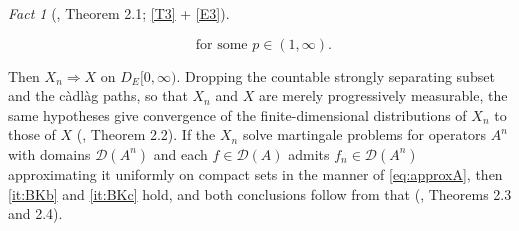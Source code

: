 \documentclass[11pt,a4paper]{article}
\theoremstyle{plain}
\theoremstyle{definition}
\theoremstyle{remark}
\newtheorem{fact}[theorem]{Fact}
\newcommand{\DE}{D_E[0,\infty)}
\newcommand{\dom}{\mathcal{D}}                 %
\DeclareMathOperator*{\wto}{\Rightarrow}
\newcommand{\BK}{\cite{BK93}}
\begin{document}
\begin{fact}[\BK, Theorem 2.1; \eqref{T3} + \eqref{E3}]
\begin{enumerate}[label=(\alph*)]
\begin{equation}
      \ \text{ for some } p \in (1,\infty) .
    \end{equation}
  \end{enumerate}
  Then $X_n \wto X$ on $\DE$.  Dropping the countable strongly separating subset
  and the c\`adl\`ag paths, so that $X_n$ and $X$ are merely progressively
  measurable, the same hypotheses give convergence of the finite-dimensional
  distributions of $X_n$ to those of $X$ (\BK, Theorem 2.2).  If the $X_n$ solve
  martingale problems for operators $A^n$ with domains $\dom(A^n)$ and each
  $f \in \dom(A)$ admits $f_n \in \dom(A^n)$ approximating it uniformly on
  compact sets in the manner of \eqref{eq:approxA}, then \ref{it:BKb} and
  \ref{it:BKc} hold, and both conclusions follow from that (\BK, Theorems 2.3
  and 2.4).
\end{fact}
\end{document}
